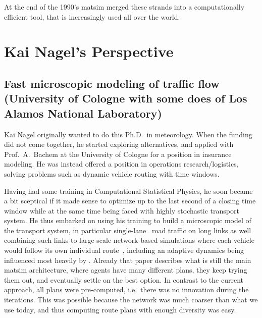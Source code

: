 At the end of the 1990’s \gls{matsim} merged these strands into a computationally efficient tool, that is increasingly used all over the world.

\section{Kai Nagel's Perspective}


\subsection{Fast microscopic modeling of traffic flow (University of Cologne with some does of Los Alamos National Laboratory)}
\label{sec:history-u-of-cologne-phase}

Kai Nagel originally wanted to do this Ph.D.\ in meteorology.  When the funding did not come together, he started exploring alternatives, and applied with Prof.\ A.\ Bachem at the University of Cologne for a position in insurance modeling.  He was instead offered a position in operations research/logistics, solving problems such as dynamic vehicle routing with time windows. 

Having had some training in Computational Statistical Physics, he soon became a bit sceptical if it made sense to optimize up to the last second of a closing time window while at the same time being faced with highly stochastic transport system.  He thus embarked on using his training to build a microscopic model of the transport system, in particular single-lane~\citep{NagelSchreckenberg1992CA,Nagel1999flowTheoTrr} road traffic on long links as well combining such links to large-scale network-based simulations where each vehicle would follow its own individual route~\citep{Nagel1996NRW}, including an adaptive dynamics being influenced most heavily by \cite{ArthurBar}.  Already that paper describes what is still the main \gls{matsim} architecture, where agents have many different plans, they keep trying them out, and eventually settle on the best option.  In contrast to the current approach, all plans were pre-computed, i.e.\ there was no innovation during the iterations.  This was possible because the network was much coarser than what we use today, and thus computing route plans with enough diversity was easy.

